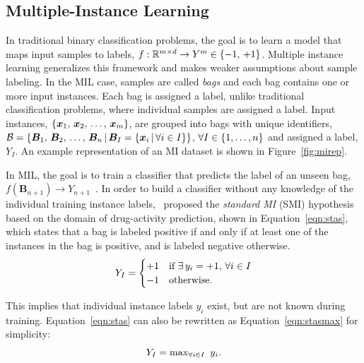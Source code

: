 \subsection{Multiple-Instance Learning}\label{subsec:mil}
In traditional binary classification problems, the goal is to learn a model that maps input samples to labels, $f: {\mathbb R}^{m \times d} \rightarrow Y^m \in {\left\{-1,\,+1\right\}}$. Multiple instance learning generalizes this framework and makes weaker assumptions about sample labeling. In the MIL case, samples are called \textit{bags} and each bag contains one or more input instances. Each bag is assigned a label, unlike traditional classification problems, where individual samples are assigned a label. Input instances, ${\left\{\bm x_1,\, \bm x_2,\, \ldots,\, \bm x_m\right\}}$, are grouped into bags with unique identifiers, $\mathcal{B} = {\left\{\bm B_1,\, \bm B_2,\, \ldots,\, \bm B_n {\,|\,} \bm B_I = {\left\{\bm x_i {\,|\,} \forall i \in I\right\}}\right\}}$, $\forall I \in {\left\{1, \ldots, n\right\}}$ and assigned a label, $Y_I$. An example representation of an MI dataset is shown in Figure~\ref{fig:mirep}. 

In MIL, the goal is to train a classifier that predicts the label of an unseen bag, $f(\bm B_{n+1}) \rightarrow Y_{n+1}$~\citep{Amores2013}. In order to build a classifier without any knowledge of the individual training instance labels,~\cite{Dietterich1997} proposed the \textit{standard MI} (SMI) hypothesis based on the domain of drug-activity prediction, shown in Equation~\ref{eqn:stas}, which states that a bag is labeled positive if and only if at least one of the instances in the bag is positive, and is labeled negative otherwise.
\begin{equation}
\centering \label{eqn:stas}
 Y_I = \begin{cases}
			+1 & \text{if }\exists\, y_i = +1,\, \forall i \in I \\
			-1 & \text{otherwise}.
		  \end{cases}
\end{equation}

This implies that individual instance labels $y_i$ exist, but are not known during training. Equation~\ref{eqn:stas} can also be rewritten as Equation~\ref{eqn:stasmax} for simplicity:
\begin{equation}
\centering \label{eqn:stasmax}
Y_I = \text{max}_{\forall i \in I}\,\,\, y_i.
\end{equation}

